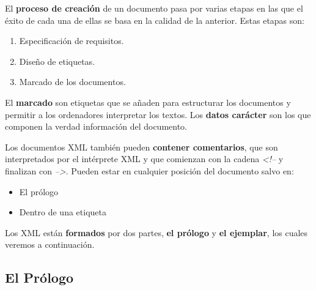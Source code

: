 El \textbf{proceso de creación} de un documento pasa por varias etapas en las que el éxito de cada una de ellas se basa en la calidad de la anterior. Estas etapas son:

\begin{enumerate}
    \item Especificación de requisitos.
    \item Diseño de etiquetas.
    \item Marcado de los documentos.
\end{enumerate}

El \textbf{marcado} son etiquetas que se añaden para estructurar los documentos y permitir a los ordenadores interpretar los textos. Los \textbf{datos carácter} son los que componen la verdad información del documento.

Los documentos XML también pueden \textbf{contener comentarios}, que son interpretados por el intérprete XML y que comienzan con la cadena \textit{<!--} y finalizan con \textit{-->}. Pueden estar en cualquier posición del documento salvo en:

\begin{itemize}
    \item El prólogo
    \item Dentro de una etiqueta
\end{itemize}

Los XML están \textbf{formados} por dos partes, \textbf{el prólogo} y \textbf{el ejemplar}, los cuales veremos a continuación.

\subsection{El Prólogo}








\glsaddall
\printglossaries


\newpage
{}



